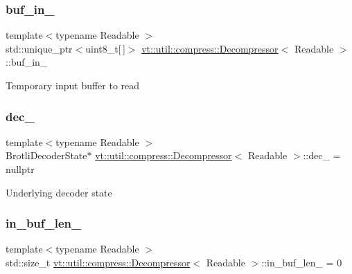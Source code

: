 \subsubsection{\texorpdfstring{buf\+\_\+in\+\_\+}{buf\_in\_}}
{\footnotesize\ttfamily template$<$typename Readable $>$ \\
std\+::unique\+\_\+ptr$<$uint8\+\_\+t\mbox{[}$\,$\mbox{]}$>$ \hyperlink{structvt_1_1util_1_1compress_1_1_decompressor}{vt\+::util\+::compress\+::\+Decompressor}$<$ Readable $>$\+::buf\+\_\+in\+\_\+\hspace{0.3cm}{\ttfamily [private]}}

Temporary input buffer to read \mbox{\label{structvt_1_1util_1_1compress_1_1_decompressor_ae65156f7178d43c24eeacf68b157308f}} 
\subsubsection{\texorpdfstring{dec\+\_\+}{dec\_}}
{\footnotesize\ttfamily template$<$typename Readable $>$ \\
Brotli\+Decoder\+State$\ast$ \hyperlink{structvt_1_1util_1_1compress_1_1_decompressor}{vt\+::util\+::compress\+::\+Decompressor}$<$ Readable $>$\+::dec\+\_\+ = nullptr\hspace{0.3cm}{\ttfamily [private]}}

Underlying decoder state \mbox{\label{structvt_1_1util_1_1compress_1_1_decompressor_a5e6aa993526c932e80f9c3c40b31722d}} 
\subsubsection{\texorpdfstring{in\+\_\+buf\+\_\+len\+\_\+}{in\_buf\_len\_}}
{\footnotesize\ttfamily template$<$typename Readable $>$ \\
std\+::size\+\_\+t \hyperlink{structvt_1_1util_1_1compress_1_1_decompressor}{vt\+::util\+::compress\+::\+Decompressor}$<$ Readable $>$\+::in\+\_\+buf\+\_\+len\+\_\+ = 0\hspace{0.3cm}{\ttfamily [private]}}

